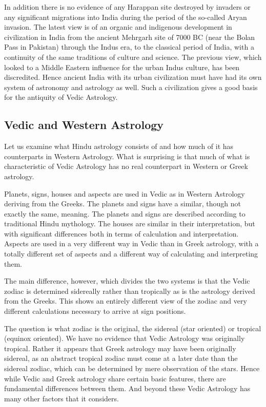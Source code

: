  

In addition there is no evidence of any Harappan site destroyed by invaders or any significant migrations into India during the period of the so-called Aryan invasion. The latest view is of an organic and indigenous development in civilization in India from the ancient Mehrgarh site of 7000 BC (near the Bolan Pass in Pakistan) through the Indus era, to the classical period of India, with a continuity of the same traditions of culture and science. The previous view, which looked to a Middle Eastern influence for the urban Indus culture, has been discredited. Hence ancient India with its urban civilization must have had its own system of astronomy and astrology as well. Such a civilization gives a good basis for the antiquity of Vedic Astrology.

 

\subsection{Vedic and Western Astrology}

 

Let us examine what Hindu astrology consists of and how much of it has counterparts in Western Astrology. What is surprising is that much of what is characteristic of Vedic Astrology has no real counterpart in Western or Greek astrology.

 

Planets, signs, houses and aspects are used in Vedic as in Western Astrology deriving from the Greeks. The planets and signs have a similar, though not exactly the same, meaning. The planets and signs are described according to traditional Hindu mythology. The houses are similar in their interpretation, but with significant differences both in terms of calculation and interpretation. Aspects are used in a very different way in Vedic than in Greek astrology, with a totally different set of aspects and a different way of calculating and interpreting them.

 

The main difference, however, which divides the two systems is that the Vedic zodiac is determined sidereally rather than tropically as is the astrology derived from the Greeks. This shows an entirely different view of the zodiac and very different calculations necessary to arrive at sign positions.

 

The question is what zodiac is the original, the sidereal (star oriented) or tropical (equinox oriented). We have no evidence that Vedic Astrology was originally tropical. Rather it appears that Greek astrology may have been originally sidereal, as an abstract tropical zodiac must come at a later date than the sidereal zodiac, which can be determined by mere observation of the stars. Hence while Vedic and Greek astrology share certain basic features, there are fundamental differences between them. And beyond these Vedic Astrology has many other factors that it considers.

